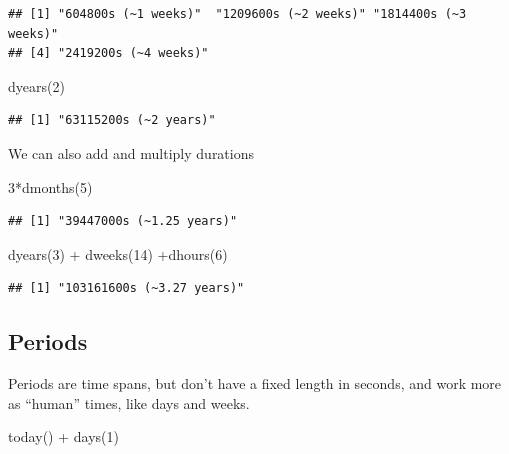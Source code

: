 \documentclass[
]{book}
\newenvironment{Shaded}{\begin{snugshade}}{\end{snugshade}}
\newcommand{\DecValTok}[1]{\textcolor[rgb]{0.00,0.00,0.81}{#1}}
\newcommand{\FunctionTok}[1]{\textcolor[rgb]{0.00,0.00,0.00}{#1}}
\newcommand{\NormalTok}[1]{#1}
\newcommand{\SpecialCharTok}[1]{\textcolor[rgb]{0.00,0.00,0.00}{#1}}
\begin{document}
\begin{verbatim}
## [1] "604800s (~1 weeks)"  "1209600s (~2 weeks)" "1814400s (~3 weeks)"
## [4] "2419200s (~4 weeks)"
\end{verbatim}

\begin{Shaded}
\begin{Highlighting}[]
\FunctionTok{dyears}\NormalTok{(}\DecValTok{2}\NormalTok{)}
\end{Highlighting}
\end{Shaded}

\begin{verbatim}
## [1] "63115200s (~2 years)"
\end{verbatim}

We can also add and multiply durations

\begin{Shaded}
\begin{Highlighting}[]
\DecValTok{3}\SpecialCharTok{*}\FunctionTok{dmonths}\NormalTok{(}\DecValTok{5}\NormalTok{)}
\end{Highlighting}
\end{Shaded}

\begin{verbatim}
## [1] "39447000s (~1.25 years)"
\end{verbatim}

\begin{Shaded}
\begin{Highlighting}[]
\FunctionTok{dyears}\NormalTok{(}\DecValTok{3}\NormalTok{) }\SpecialCharTok{+} \FunctionTok{dweeks}\NormalTok{(}\DecValTok{14}\NormalTok{) }\SpecialCharTok{+}\FunctionTok{dhours}\NormalTok{(}\DecValTok{6}\NormalTok{)}
\end{Highlighting}
\end{Shaded}

\begin{verbatim}
## [1] "103161600s (~3.27 years)"
\end{verbatim}

\hypertarget{periods}{%
\subsection{Periods}\label{periods}}

Periods are time spans, but don't have a fixed length in seconds, and work more as ``human'' times, like days and weeks.

\begin{Shaded}
\begin{Highlighting}[]
\FunctionTok{today}\NormalTok{() }\SpecialCharTok{+} \FunctionTok{days}\NormalTok{(}\DecValTok{1}\NormalTok{)}
\end{Highlighting}
\end{Shaded}
\end{document}
